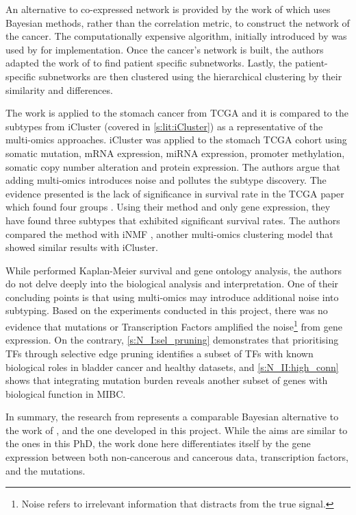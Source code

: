 An alternative to co-expressed network is provided by the work of \citet{Nakazawa2021-yq} which uses Bayesian methods, rather than the correlation metric, to construct the network of the cancer. The computationally expensive algorithm, initially introduced by \citet{Imoto2001-uc} was used by \citet{Tamada2011-ok} for implementation. Once the cancer’s network is built, the authors adapted the work of \citet{Tanaka2020-mw} to find patient specific subnetworks. Lastly, the patient-specific subnetworks are then clustered using the hierarchical clustering by their similarity and differences.

The work is applied to the stomach cancer from TCGA and it is compared to the subtypes from iCluster \citep{Shen2009-ew} (covered in \cref{s:lit:iCluster}) as a representative of the multi-omics approaches. iCluster was applied to the stomach TCGA cohort using somatic mutation, mRNA expression, miRNA expression, promoter methylation, somatic copy number alteration and protein expression. The authors \citet{Nakazawa2021-yq} argue that adding multi-omics introduces noise and pollutes the subtype discovery. The evidence presented is the lack of significance in survival rate in the TCGA paper which found four groups \citep{Cancer_Genome_Atlas_Research_Network2014-xp}. Using their method and only gene expression, they have found three subtypes that exhibited significant survival rates. The authors compared the method with iNMF \citep{Yang2016-dm}, another multi-omics clustering model that showed similar results with iCluster.

While \cite{Nakazawa2021-yq} performed Kaplan-Meier survival and gene ontology analysis, the authors do not delve deeply into the biological analysis and interpretation. One of their concluding points is that using multi-omics may introduce additional noise into subtyping. Based on the experiments conducted in this project, there was no evidence that mutations or Transcription Factors amplified the noise\footnote{Noise refers to irrelevant information that distracts from the true signal.} from gene expression. On the contrary, \cref{s:N_I:sel_pruning} demonstrates that prioritising TFs through selective edge pruning identifies a subset of TFs with known biological roles in bladder cancer and healthy datasets, and \cref{s:N_II:high_conn} shows that integrating mutation burden reveals another subset of genes with biological function in MIBC.


In summary, the research from \citet{Nakazawa2021-yq} represents a comparable Bayesian alternative to the work of \citet{Care2019-ij}, and the one developed in this project. While the aims are similar to the ones in this PhD, the work done here differentiates itself by the gene expression between both non-cancerous and cancerous data, transcription factors, and the mutations.


